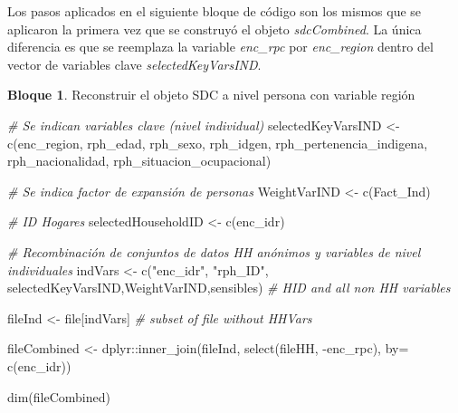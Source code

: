 \documentclass[
]{book}
\newenvironment{Shaded}{\begin{snugshade}}{\end{snugshade}}
\newcommand{\AttributeTok}[1]{\textcolor[rgb]{0.77,0.63,0.00}{#1}}
\newcommand{\CommentTok}[1]{\textcolor[rgb]{0.56,0.35,0.01}{\textit{#1}}}
\newcommand{\FunctionTok}[1]{\textcolor[rgb]{0.00,0.00,0.00}{#1}}
\newcommand{\NormalTok}[1]{#1}
\newcommand{\OtherTok}[1]{\textcolor[rgb]{0.56,0.35,0.01}{#1}}
\newcommand{\SpecialCharTok}[1]{\textcolor[rgb]{0.00,0.00,0.00}{#1}}
\newcommand{\StringTok}[1]{\textcolor[rgb]{0.31,0.60,0.02}{#1}}
\theoremstyle{definition}
\theoremstyle{definition}
\newtheorem{example}{Bloque}[chapter]
\theoremstyle{definition}
\theoremstyle{definition}
\theoremstyle{remark}
\begin{document}
Los pasos aplicados en el siguiente bloque de código son los mismos que se aplicaron la primera vez que se construyó el objeto \emph{sdcCombined}. La única diferencia es que se reemplaza la variable \emph{enc\_rpc} por \emph{enc\_region} dentro del vector de variables clave \emph{selectedKeyVarsIND}.

\begin{example}
\protect\hypertarget{exm:bloque58nbm}{}\label{exm:bloque58nbm}Reconstruir el objeto SDC a nivel persona con variable región
\end{example}

\begin{Shaded}
\begin{Highlighting}[]
\CommentTok{\# Se indican variables clave (nivel individual)}
\NormalTok{selectedKeyVarsIND }\OtherTok{\textless{}{-}} \FunctionTok{c}\NormalTok{(}\StringTok{\textquotesingle{}enc\_region\textquotesingle{}}\NormalTok{,}
                        \StringTok{\textquotesingle{}rph\_edad\textquotesingle{}}\NormalTok{,}
                        \StringTok{\textquotesingle{}rph\_sexo\textquotesingle{}}\NormalTok{,}
                        \StringTok{\textquotesingle{}rph\_idgen\textquotesingle{}}\NormalTok{,}
                        \StringTok{\textquotesingle{}rph\_pertenencia\_indigena\textquotesingle{}}\NormalTok{, }
                       \StringTok{\textquotesingle{}rph\_nacionalidad\textquotesingle{}}\NormalTok{,}
                       \StringTok{\textquotesingle{}rph\_situacion\_ocupacional\textquotesingle{}}\NormalTok{) }

\CommentTok{\# Se indica factor de expansión de personas}
\NormalTok{WeightVarIND }\OtherTok{\textless{}{-}} \FunctionTok{c}\NormalTok{(}\StringTok{\textquotesingle{}Fact\_Ind\textquotesingle{}}\NormalTok{)}

\CommentTok{\# ID Hogares}
\NormalTok{selectedHouseholdID }\OtherTok{\textless{}{-}} \FunctionTok{c}\NormalTok{(}\StringTok{\textquotesingle{}enc\_idr\textquotesingle{}}\NormalTok{)}

\CommentTok{\# Recombinación de conjuntos de datos HH anónimos y variables de nivel individuales}
\NormalTok{indVars }\OtherTok{\textless{}{-}} \FunctionTok{c}\NormalTok{(}\StringTok{"enc\_idr"}\NormalTok{, }\StringTok{"rph\_ID"}\NormalTok{, selectedKeyVarsIND,WeightVarIND,sensibles) }\CommentTok{\# HID and all non HH variables}

\NormalTok{fileInd }\OtherTok{\textless{}{-}}\NormalTok{ file[indVars] }\CommentTok{\# subset of file without HHVars}

\NormalTok{fileCombined }\OtherTok{\textless{}{-}}\NormalTok{ dplyr}\SpecialCharTok{::}\FunctionTok{inner\_join}\NormalTok{(fileInd, }\FunctionTok{select}\NormalTok{(fileHH, }\SpecialCharTok{{-}}\NormalTok{enc\_rpc), }\AttributeTok{by=} \FunctionTok{c}\NormalTok{(}\StringTok{\textquotesingle{}enc\_idr\textquotesingle{}}\NormalTok{))}

\FunctionTok{dim}\NormalTok{(fileCombined)}
\end{Highlighting}
\end{Shaded}
\end{document}

